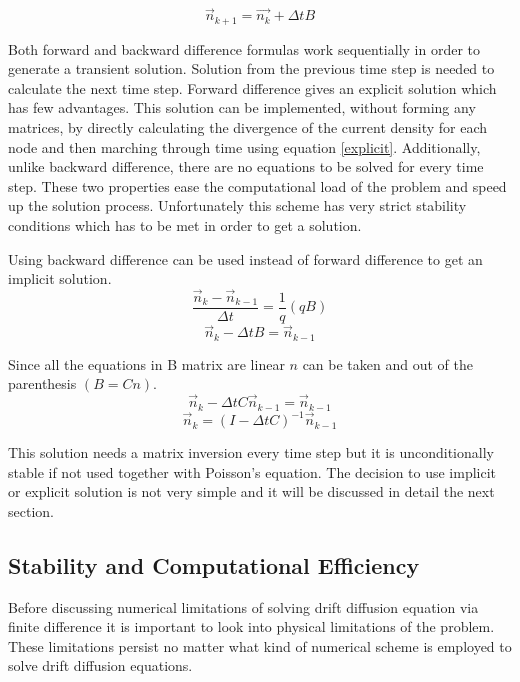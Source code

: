 \begin{equation}
\vec{n}_{k+1}=\vec{n_{k}}+\Delta t B
\label{explicit}
\end{equation}

Both forward and backward difference formulas work sequentially in order to generate a transient solution. Solution from the previous time step is needed to calculate the next time step. Forward difference gives an explicit solution which has few advantages. This solution can be implemented, without forming any matrices, by directly calculating the divergence of the current density for each node and then marching through time using equation \ref{explicit}. Additionally, unlike backward difference, there are no equations to be solved for every time step. These two properties ease the computational load of the problem and speed up the solution process. Unfortunately this scheme has very strict stability conditions which has to be met in order to get a solution.

Using backward difference can be used instead of forward difference to get an implicit solution.
\begin{equation}\nonumber
\frac{ \vec{n}_{k}-\vec{n}_{k-1}}{\Delta t}=\frac{1}{q}(qB)
\end{equation}
\begin{equation}\nonumber
\vec{n}_{k}-\Delta t B =\vec{n}_{k-1}
\end{equation}

Since all the equations in B matrix are linear  $n$ can be taken and out of the parenthesis $(B=Cn)$.
\begin{equation}\nonumber
\vec{n}_{k}-\Delta t C\vec{n}_{k-1} =\vec{n}_{k-1}
\end{equation}
\begin{equation}
\vec{n}_k=(I-\Delta t C)^{-1}\vec{n}_{k-1}
\end{equation}

This solution needs a matrix inversion every time step but it is unconditionally stable if not used together with Poisson's equation. The decision to use implicit or explicit solution is not very simple and it will be discussed in detail the next section.
\clearpage
\subsection{Stability and Computational Efficiency}
Before discussing numerical limitations of solving drift diffusion equation via finite difference it is important to look into physical limitations of the problem. These limitations persist no matter what kind of numerical scheme is employed to solve drift diffusion equations.

